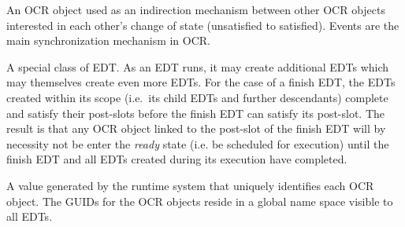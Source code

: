 
\glossarydefstart
An OCR object used as an indirection mechanism between other OCR
objects interested in each other's change of state (unsatisfied to
satisfied). Events are the main synchronization mechanism in OCR.
\glossarydefend

\glossarydefstart
A special class of EDT. As an EDT runs, it may create additional EDTs
which may themselves create even more EDTs. 
For the case of a finish
EDT, the EDTs created within its scope (i.e.\ its child EDTs and further
descendants) complete and satisfy their post-slots
before the finish EDT can satisfy its post-slot. The result is that
any OCR object linked to the post-slot of the finish EDT will by
necessity not be enter the \emph{ready} state (i.e. be scheduled for 
execution) until the finish EDT and all
EDTs created during its execution have completed.
%
%

\glossarydefend


\glossarydefstart
A value generated by the runtime system that uniquely identifies each
OCR object. The GUIDs for the OCR objects reside in a global name
space visible to all EDTs.
\glossarydefend

%
%

